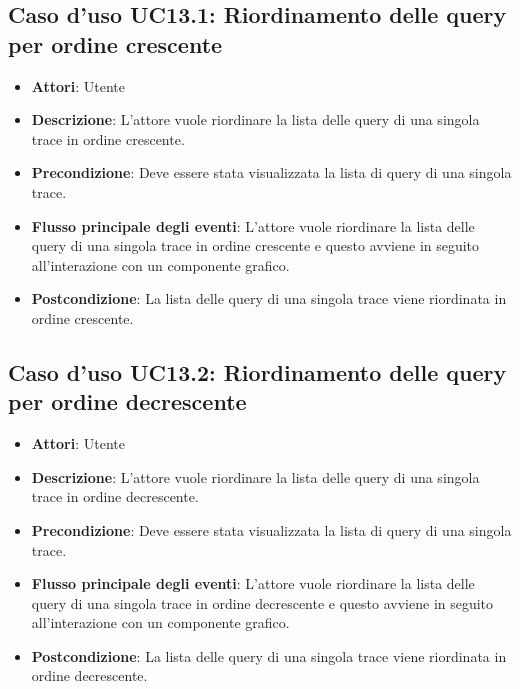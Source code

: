 \subsection{Caso d'uso UC13.1: Riordinamento delle query per ordine crescente}
\begin{itemize}
	\item \textbf{Attori}: Utente
	\item \textbf{Descrizione}: L'attore vuole riordinare la lista delle query di una singola trace in ordine crescente.
	\item \textbf{Precondizione}: Deve essere stata visualizzata la lista di query di una singola trace.
	\item \textbf{Flusso principale degli eventi}: L'attore vuole riordinare la lista delle query di una singola trace in ordine crescente e questo avviene in seguito all'interazione con un componente grafico.
	\item \textbf{Postcondizione}: La lista delle query di una singola trace viene riordinata in ordine crescente.
\end{itemize}
\subsection{Caso d'uso UC13.2: Riordinamento delle query per ordine decrescente}
\begin{itemize}
	\item \textbf{Attori}: Utente
	\item \textbf{Descrizione}: L'attore vuole riordinare la lista delle query di una singola trace in ordine decrescente.
	\item \textbf{Precondizione}: Deve essere stata visualizzata la lista di query di una singola trace.
	\item \textbf{Flusso principale degli eventi}: L'attore vuole riordinare la lista delle query di una singola trace in ordine decrescente e questo avviene in seguito all'interazione con un componente grafico.
	\item \textbf{Postcondizione}: La lista delle query di una singola trace viene riordinata in ordine decrescente.
	
\end{itemize}
